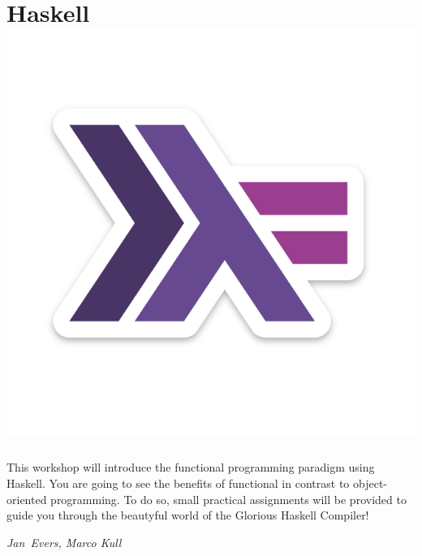 \section*{Haskell\hfill\includegraphics[width=.35\linewidth]{images/haskell-logo.png}}

This workshop will introduce the functional programming paradigm using Haskell. You are going to see the benefits of functional  in contrast to object-oriented programming. To do so, small practical assignments will be provided to guide you through the beautyful world of the Glorious Haskell Compiler! 

\hfill\textit{Jan~Evers, Marco Kull}
